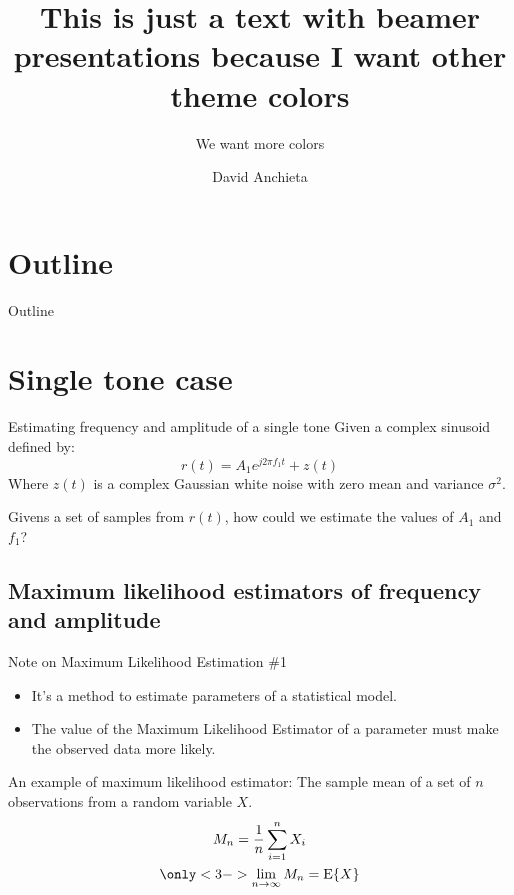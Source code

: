 ﻿\documentclass[mathserif]{beamer}
\title[Beamer themes] %
{\textbf{This is just a text with beamer presentations because I want other theme colors}}
\subtitle{We want more colors}
\author{David Anchieta}
\begin{document}
	\frame{\titlepage}

	\section*{Outline}
	\begin{frame}{Outline}		
		\tableofcontents
	\end{frame}
	
	\section{Single tone case}
	\begin{frame}{Estimating frequency and amplitude of a single tone}
		Given a complex sinusoid defined by:
		\begin{equation*}
			r(t) = A_{1}e^{j2\pi f_1 t} + z(t)
		\end{equation*}
		Where $z(t)$ is a complex Gaussian white noise with zero mean and variance $\sigma^2$.
		
		Givens a set of samples from $r(t)$, how could we estimate the values of $A_1$ and $f_1$?	
		
	\end{frame}
	
	
	\subsection{Maximum likelihood estimators of frequency and amplitude}
	
	\begin{frame}{Note on Maximum Likelihood Estimation \#1}
		\begin{itemize}
			\item It's a method to estimate parameters of a statistical model.
			\item The value of the Maximum Likelihood Estimator of a parameter must make the observed data more likely.
		\end{itemize}
		\pause
		An example of maximum likelihood estimator: The sample mean of a set of $n$ observations from a random variable $X$.
		\begin{gather*}
			M_n = \frac{1}{n}\sum_{i=1}^nX_i\\
			\only<3->{ \lim_{n \to \infty}M_n = \mathrm{E}\{X\}}
		\end{gather*}
	\end{frame}
	
\end{document}
